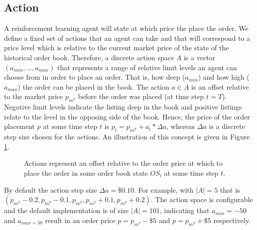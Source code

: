 \subsection{Action}
A reinforcement learning agent will state at which price the place the order.
We define a fixed set of actions that an agent can take and that will correspond to a price level which is relative to the current market price of the state of the historical order book.
Therefore, a discrete action space $A$ is a vector $(a_{min}, . . . , a_{max})$ that represents a range of relative limit levels an agent can choose from in order to place an order. 
That is, how deep ($a_{min}$) and how high ($a_{max}$) the order can be placed in the book.
The action $a \in A$ is an offset relative to the market price $p_{m^T}$ before the order was placed (at time step $t=T$).
Negative limit levels indicate the listing deep in the book and positive listings relate to the level in the opposing side of the book.
Hence, the price of the order placement $p$ at some time step $t$ is $p_t = p_{m^T} + a_i * \Delta{a}$, whereas $\Delta{a}$ is a discrete step size chosen for the actions.
An illustration of this concept is given in Figure \ref{fig:setup-actions}.
\begin{figure}[H]
    \centering
    \caption{Actions represent an offset relative to the order price at which to place the order in some order book state $OS_i$ at some time step $t$.}
    \label{fig:setup-actions}
\end{figure}
By default the action step size $\Delta{a}=\$0.10$.
For example, with $|A|=5$ that is $(p_{m^T}-0.2, p_{m^T}-0.1, p_{m^T}, p_{m^T}+0.1, p_{m^T}+0.2)$.
The action space is configurable and the default implementation is of size $|A|=101$, indicating that $a_{min}=-50$ and $a_{max=50}$ result in an order price $p=p_{m^T}-\$5$ and $p=p_{m^T}+\$5$ respectively.

